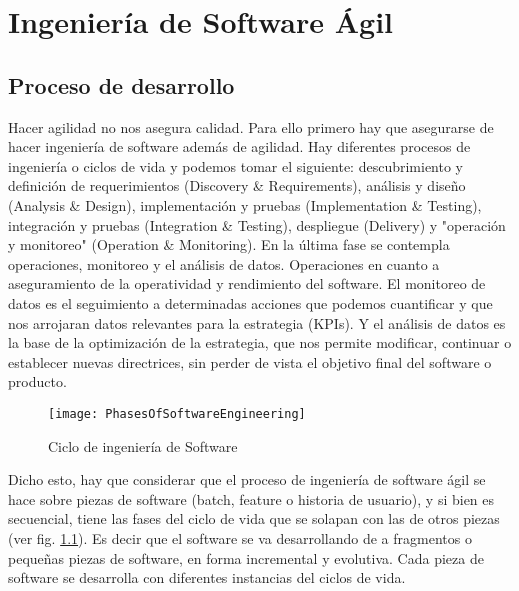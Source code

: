 \chapter{Ingeniería de Software Ágil}

\section{Proceso de desarrollo}

Hacer agilidad no nos asegura calidad. Para ello primero hay que asegurarse de hacer ingeniería de software además de agilidad. Hay diferentes procesos de ingeniería o ciclos de vida y podemos tomar el siguiente: descubrimiento y definición de requerimientos (Discovery \& Requirements), análisis y diseño (Analysis \& Design), implementación y pruebas (Implementation \& Testing), integración y pruebas (Integration \& Testing), despliegue (Delivery) y "operación y monitoreo" (Operation \& Monitoring). En la última fase se contempla operaciones, monitoreo y el análisis de datos. Operaciones en cuanto a aseguramiento de la operatividad y rendimiento del software. El monitoreo de datos es el seguimiento a determinadas acciones que podemos cuantificar y que nos arrojaran datos relevantes para la estrategia (KPIs). Y el análisis de datos es la base de la optimización de la estrategia, que nos permite modificar, continuar o establecer nuevas directrices, sin perder de vista el objetivo final del software o producto.

\begin{figure}[h]
  \centering
  \texttt{[image: PhasesOfSoftwareEngineering]}
  \caption{Ciclo de ingeniería de Software}
  \centering
  \label{fig:PhasesOfSoftwareEngineering} %
\end{figure}
\FloatBarrier %


Dicho esto, hay que considerar que el proceso de ingeniería de software ágil se hace sobre piezas de software (batch, feature o historia de usuario), y si bien es secuencial, tiene las fases del ciclo de vida que se solapan con las de otros piezas (ver fig. \ref{fig:PhasesOfSoftwareEngineering}). Es decir que el software se va desarrollando de a fragmentos o pequeñas piezas de software, en forma incremental y evolutiva. Cada pieza de software se desarrolla con diferentes instancias del ciclos de vida.

